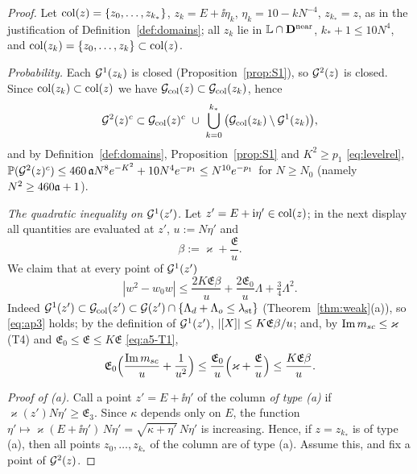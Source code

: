 \begin{proof}
Let ${\rm col}(z)=\{z_0,\dots,z_{k_*}\}$, $z_k=E+\ii\eta_k$, $\eta_k=10-kN^{-4}$, $z_{k_*}=z$, as in the justification of Definition~\ref{def:domains}; all $z_k$ lie in $\mathbb L\cap\mathbf{D}^{\rm near}$, $k_*+1\le10N^4$, and ${\rm col}(z_k)=\{z_0,\dots,z_k\}\subset{\rm col}(z)$.

\emph{Probability.} Each $\mathcal{G}^1(z_k)$ is closed (Proposition~\ref{prop:S1}), so $\mathcal{G}^2(z)$ is closed. Since ${\rm col}(z_k)\subset{\rm col}(z)$ we have $\mathcal{G}_{\rm col}(z)\subset\mathcal{G}_{\rm col}(z_k)$, hence
\[
 \cG^2(z)^c\subset\cG_{\rm col}(z)^c\ \cup\ \bigcup_{k=0}^{k_*}\big(\cG_{\rm col}(z_k)\setminus\cG^1(z_k)\big),
\]
and by Definition~\ref{def:domains}, Proposition~\ref{prop:S1} and $K^2\ge p_1$ \eqref{eq:levelrel},
$\mathbb{P}(\mathcal{G}^2(z)^c)\le460\,\mathfrak{a} N^8e^{-K^2}+10N^4e^{-p_1}\le N^{10}e^{-p_1}$ for $N\ge N_0$ (namely $N^{2}\ge460\mathfrak{a}+1$).

\emph{The quadratic inequality on $\mathcal{G}^1(z')$.} Let $z'=E+\mathrm{i}\eta'\in{\rm col}(z)$; in the next display all quantities are evaluated at $z'$, $u:=N\eta'$ and
\[
 \beta:=\varkappa+\frac{\mathfrak E}{u}.
\]
We claim that at every point of $\mathcal{G}^1(z')$
\begin{equation}\label{eq:Q1}
 |w^2-w_0w|\le\frac{2K\mathfrak E\beta}{u}+\frac{2\mathfrak E_0}{u}\Lambda+\tfrac34\Lambda^2 .
\end{equation}
Indeed $\mathcal{G}^1(z')\subset\mathcal{G}_{\rm col}(z')\subset\mathcal{G}(z')\cap\{\Lambda_d+\Lambda_o\le\lambda_{\rm st}\}$ (Theorem~\ref{thm:weak}(a)), so \eqref{eq:ap3} holds; by the definition of $\mathcal{G}^1(z')$, $|[X]|\le K\mathfrak E\beta/u$; and, by $\operatorname{Im}m_{sc}\le\varkappa$ (T4) and $\mathfrak E_0\le\mathfrak E\le K\mathfrak E$ \eqref{eq:a5-T1},
\[
 \mathfrak E_0\Big(\frac{\operatorname{Im}m_{sc}}{u}+\frac1{u^2}\Big)\le\frac{\mathfrak E_0}{u}\Big(\varkappa+\frac{\mathfrak E}{u}\Big)\le\frac{K\mathfrak E\beta}{u}.
\]

\emph{Proof of \textup{(a)}.} Call a point $z'=E+\ii\eta'$ of the column \emph{of type \textup{(a)}} if $\varkappa(z')N\eta'\ge\mathfrak E_3$. Since $\kappa$ depends only on $E$, the function $\eta'\mapsto\varkappa(E+\ii\eta')\,N\eta'=\sqrt{\kappa+\eta'}\,N\eta'$ is increasing. Hence, if $z=z_{k_*}$ is of type (a), then all points $z_0,\dots,z_{k_*}$ of the column are of type (a).
Assume this, and fix a point of $\mathcal{G}^2(z)$.


\end{proof}
